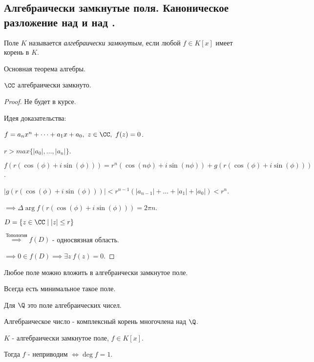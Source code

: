 \subsection{Алгебраически замкнутые поля. Каноническое разложение над \CC и над \R.}

\begin{defn}
    Поле $K$ называется \emph{алгебраически замкнутым}, если любой $f \in K[x]$ имеет корень в $K$.
\end{defn}

\begin{theorem}
    Основная теорема алгебры.

    $\CC$ алгебраически замкнуто.
\end{theorem}

\begin{proof}
     Не будет в курсе.

     Идея доказательства:

     $f = a_nx^n + \dots + a_1x + a_0,~ z \in \CC,~ f(z) = 0$.

     $r > max\{|a_0|, \ldots, |a_n|\}$.

     $f(r(\cos(\phi) + i\sin(\phi))) = r^n(\cos(n\phi) + i\sin(n\phi)) + g(r(\cos(\phi) + i\sin(\phi)))$.

     $|g(r(\cos(\phi) + i\sin(\phi)))| < r^{n - 1}(|a_{n - 1}| + \ldots + |a_1| + |a_0|) < r^n$.

     $\implies \Delta \arg f(r(\cos(\phi) + i\sin(\phi))) = 2\pi n$.

     $D = \{z \in \CC \mid |z| \le r\}$

     $\overset{\text{Топология}}{\implies} f(D)$ - односвязная область.

     $\implies 0 \in f(D) \implies \exists z~f(z) = 0$.
\end{proof}

\begin{notice} 
    Любое поле можно вложить в алгебраически замкнутое поле. 
    
    Всегда есть минимальное такое поле.

    Для $\Q$ это поле алгебраических чисел.

    Алгебраическое число - комплексный корень многочлена над $\Q$.
\end{notice}

\begin{theorem-non}
    $K$ - алгебраически замкнутое поле, $f \in K[x]$.

    Тогда $f$ - неприводим $\iff \deg f = 1$.
\end{theorem-non}

